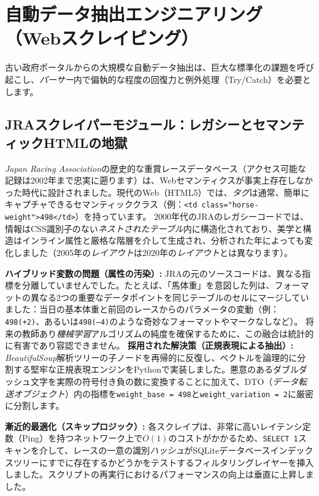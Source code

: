 \documentclass[12pt,a4paper]{article}
\begin{document}
\section{自動データ抽出エンジニアリング（Webスクレイピング）}
古い政府ポータルからの大規模な自動データ抽出は、巨大な標準化の課題を呼び起こし、\textit{パーサー}内で偏執的な程度の回復力と例外処理（Try/Catch）を必要とします。

\subsection{JRAスクレイパーモジュール：レガシーとセマンティックHTMLの地獄}
\textit{Japan Racing Association}の歴史的な重賞レースデータベース（アクセス可能な記録は2002年まで忠実に遡ります）は、Webセマンティクスが事実上存在しなかった時代に設計されました。現代のWeb（HTML5）では、\textit{タグ}は通常、簡単にキャプチャできるセマンティッククラス（例：\texttt{<td class="horse-weight">498</td>}）を持っています。
2000年代のJRAのレガシーコードでは、情報はCSS識別子のない\textit{ネストされたテーブル}内に構造化されており、美学と構造はインライン属性と厳格な階層を介して生成され、分析された年によっても変化しました（2005年の\textit{レイアウト}は2020年の\textit{レイアウト}とは異なります）。

\textbf{ハイブリッド変数の問題（属性の汚染）:} JRAの元のソースコードは、異なる指標を分離していませんでした。たとえば、「馬体重」を意図した列は、フォーマットの異なる2つの重要なデータポイントを同じテーブルのセルにマージしていました：当日の基本体重と前回のレースからのパラメータの変動（例：\texttt{498(+2)}、あるいは\texttt{498(--4)}のような奇妙なフォーマットやマークなしなど）。
将来の教師あり\textit{機械学習}アルゴリズムの純度を確保するために、この融合は統計的に有害であり容認できません。
\textbf{採用された解決策（正規表現による抽出）:} \textit{BeautifulSoup}解析ツリーの子ノードを再帰的に反復し、ベクトルを論理的に分割する堅牢な正規表現エンジンをPythonで実装しました。悪意のあるダブルダッシュ文字を実際の符号付き負の数に変換することに加えて、DTO（\textit{データ転送オブジェクト}）内の指標を\texttt{weight\_base = 498}と\texttt{weight\_variation = 2}に厳密に分割します。

\textbf{漸近的最適化（スキップロジック）:} 各スクレイプは、非常に高いレイテンシ定数（Ping）を持つネットワーク上で$O(1)$のコストがかかるため、\texttt{SELECT 1}スキャンを介して、レースの一意の識別\textit{ハッシュ}がSQLiteデータベースインデックスツリーにすでに存在するかどうかをテストするフィルタリングレイヤーを挿入しました。スクリプトの再実行におけるパフォーマンスの向上は垂直に上昇しました。
\end{document}
